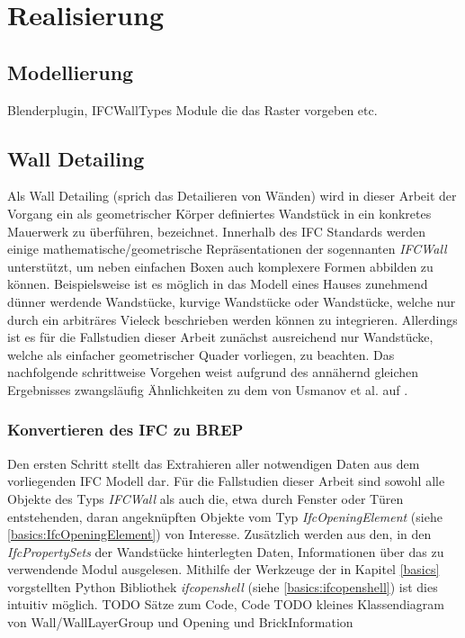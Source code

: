 \chapter{Realisierung}
\section{Modellierung}
Blenderplugin, IFCWallTypes Module die das Raster vorgeben etc.

\section{Wall Detailing}
Als \glqq{}Wall Detailing\grqq{} (sprich das \glqq{}Detailieren von Wänden\grqq{}) wird in dieser Arbeit der Vorgang ein als geometrischer Körper definiertes Wandstück in ein konkretes Mauerwerk zu überführen, bezeichnet.
Innerhalb des IFC Standards werden einige mathematische/geometrische Repräsentationen der sogennanten \textit{IFCWall} unterstützt, um neben einfachen Boxen auch komplexere Formen abbilden zu können.
Beispielsweise ist es möglich in das Modell eines Hauses zunehmend dünner werdende Wandstücke, kurvige Wandstücke oder Wandstücke, welche nur durch ein arbiträres Vieleck beschrieben werden können zu integrieren.
Allerdings ist es für die Fallstudien dieser Arbeit zunächst ausreichend nur Wandstücke, welche als einfacher geometrischer Quader vorliegen, zu beachten.
Das nachfolgende schrittweise Vorgehen weist aufgrund des annähernd gleichen Ergebnisses zwangsläufig Ähnlichkeiten zu dem von Usmanov et al. auf \cite{Usmanov2021}.

\subsection{Konvertieren des IFC zu BREP}
Den ersten Schritt stellt das Extrahieren aller notwendigen Daten aus dem vorliegenden IFC Modell dar.
Für die Fallstudien dieser Arbeit sind sowohl alle Objekte des Typs \textit{IFCWall} als auch die, etwa durch Fenster oder Türen entstehenden, daran angeknüpften Objekte vom Typ \textit{IfcOpeningElement} (siehe \ref{basics:IfcOpeningElement}) von Interesse.
Zusätzlich werden aus den, in den \textit{IfcPropertySets} der Wandstücke hinterlegten Daten, Informationen über das zu verwendende Modul ausgelesen.
Mithilfe der Werkzeuge der in Kapitel \ref{basics} vorgstellten Python Bibliothek \textit{ifcopenshell} (siehe \ref{basics:ifcopenshell}) ist dies intuitiv möglich.
TODO Sätze zum Code, Code TODO kleines Klassendiagram von Wall/WallLayerGroup und Opening und BrickInformation

